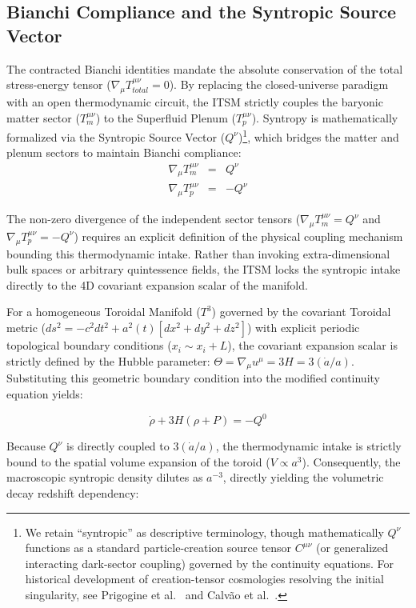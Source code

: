 \documentclass[aps,prd,10pt,twocolumn,superscriptaddress,nofootinbib,floatfix]{revtex4-2}
\begin{document}
\subsection{Bianchi Compliance and the Syntropic Source Vector}
The contracted Bianchi identities mandate the absolute conservation of the total stress-energy tensor ($\nabla_\mu T_{total}^{\mu\nu} = 0$). By replacing the closed-universe paradigm with an open thermodynamic circuit, the ITSM strictly couples the baryonic matter sector ($T_m^{\mu\nu}$) to the Superfluid Plenum ($T_p^{\mu\nu}$). Syntropy is mathematically formalized via the Syntropic Source Vector ($Q^\nu$)\footnote{We retain ``syntropic'' as descriptive terminology, though mathematically $Q^\nu$ functions as a standard particle-creation source tensor $C^{\mu\nu}$ (or generalized interacting dark-sector coupling) governed by the continuity equations. For historical development of creation-tensor cosmologies resolving the initial singularity, see Prigogine et al.\ \cite{prigogine_creation} and Calvão et al.\ \cite{calvao_creation}.}, which bridges the matter and plenum sectors to maintain Bianchi compliance:
\begin{eqnarray}
\nabla_\mu T_m^{\mu\nu} &=& Q^\nu \\
\nabla_\mu T_p^{\mu\nu} &=& -Q^\nu
\end{eqnarray}

The non-zero divergence of the independent sector tensors ($\nabla_{\mu}T_{m}^{\mu\nu} = Q^{\nu}$ and $\nabla_{\mu}T_{p}^{\mu\nu} = -Q^{\nu}$) requires an explicit definition of the physical coupling mechanism bounding this thermodynamic intake. Rather than invoking extra-dimensional bulk spaces or arbitrary quintessence fields, the ITSM locks the syntropic intake directly to the 4D covariant expansion scalar of the manifold. 

For a homogeneous Toroidal Manifold ($T^3$) governed by the covariant Toroidal metric ($ds^2 = -c^2dt^2 + a^2(t)[dx^2 + dy^2 + dz^2]$) with explicit periodic topological boundary conditions ($x_i \sim x_i + L$), the covariant expansion scalar is strictly defined by the Hubble parameter: $\Theta = \nabla_\mu u^\mu = 3H = 3(\dot{a}/a)$. Substituting this geometric boundary condition into the modified continuity equation yields:

\begin{equation}
\dot{\rho} + 3H(\rho + P) = -Q^0
\end{equation}

Because $Q^\nu$ is directly coupled to $3(\dot{a}/a)$, the thermodynamic intake is strictly bound to the spatial volume expansion of the toroid ($V \propto a^3$). Consequently, the macroscopic syntropic density dilutes as $a^{-3}$, directly yielding the volumetric decay redshift dependency:
\end{document}
